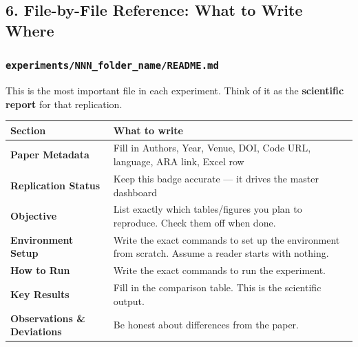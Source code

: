 \subsection{6. File-by-File Reference: What to Write
Where}\label{file-by-file-reference-what-to-write-where}

\subsubsection{\texorpdfstring{\texttt{experiments/NNN\_folder\_name/README.md}}{experiments/NNN\_folder\_name/README.md}}\label{experimentsnnn_folder_namereadme.md}

This is the most important file in each experiment. Think of it as the
\textbf{scientific report} for that replication.

{\def\LTcaptype{none} %
\small
\begin{longtable}[]{@{}
  >{\raggedright\arraybackslash}p{}
  >{\raggedright\arraybackslash}p{}@{}}
\toprule\noalign{}
\begin{minipage}[b]{\linewidth}\raggedright
Section
\end{minipage} & \begin{minipage}[b]{\linewidth}\raggedright
What to write
\end{minipage} \\
\midrule\noalign{}
\endhead
\bottomrule\noalign{}
\endlastfoot
\textbf{Paper Metadata} & Fill in Authors, Year, Venue, DOI, Code URL,
language, ARA link, Excel row \\
\textbf{Replication Status} & Keep this badge accurate --- it drives the
master dashboard \\
\textbf{Objective} & List exactly which tables/figures you plan to
reproduce. Check them off when done. \\
\textbf{Environment Setup} & Write the exact commands to set up the
environment from scratch. Assume a reader starts with nothing. \\
\textbf{How to Run} & Write the exact commands to run the experiment. \\
\textbf{Key Results} & Fill in the comparison table. This is the
scientific output. \\
\textbf{Observations \& Deviations} & Be honest about differences from
the paper. \\
\end{longtable}
}

